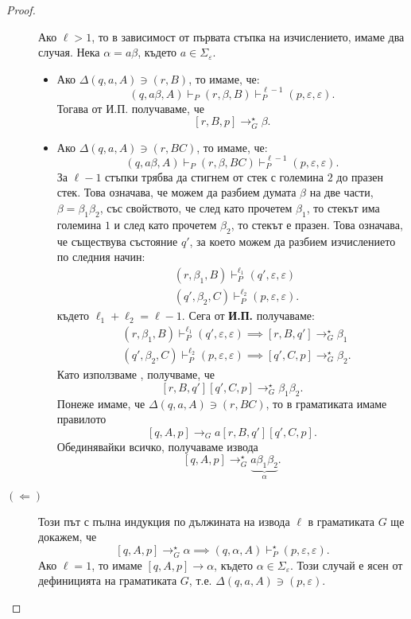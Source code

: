 \begin{proof}
\begin{description}
    Ако $\ell > 1$, то в зависимост от първата стъпка на изчислението, имаме два случая.
    Нека $\alpha = a\beta$, където $a \in \Sigma_\varepsilon$.
    \begin{itemize}
    \item 
      Ако $\Delta(q,a,A) \ni (r,B)$, то имаме, че:
      \[(q,a\beta,A) \vdash_P (r,\beta,B) \vdash^{\ell-1}_P (p, \varepsilon, \varepsilon).\]
      Тогава от И.П. получаваме, че
      \[[r,B,p] \to^\star_G \beta.\]
    \item
      Ако $\Delta(q, a, A) \ni (r, BC)$, то имаме, че:
      \[(q, a\beta, A) \vdash_P (r, \beta, BC) \vdash^{\ell-1}_P (p, \varepsilon, \varepsilon).\]      
      За $\ell-1$ стъпки трябва да стигнем от стек с големина $2$ до празен стек.
      Това означава, че можем да разбием думата $\beta$ на две части, $\beta = \beta_1\beta_2$, със свойството, че след като прочетем $\beta_1$,
      то стекът има големина $1$ и след като прочетем $\beta_2$, то стекът е празен.
      Това означава, че съществува състояние $q'$, за което можем да разбием изчислението по следния начин:
      \begin{align*}
        & (r, \beta_1, B) \vdash^{\ell_1}_P (q',\varepsilon,\varepsilon)\\
        & (q', \beta_2, C) \vdash^{\ell_2}_P (p,\varepsilon,\varepsilon).
      \end{align*}
      където $\ell_1 + \ell_2 = \ell - 1$.    
      Сега от {\bf И.П.} получаваме:
      \begin{align*}
        & (r, \beta_1, B) \vdash^{\ell_1}_P (q', \varepsilon, \varepsilon) \implies [r, B, q'] \to^\star_G \beta_1\\
        & (q', \beta_2, C) \vdash^{\ell_2}_P (p, \varepsilon, \varepsilon) \implies [q', C, p] \to^\star_G \beta_2.
      \end{align*}
      Като използваме , получваме, че
      \[[r,B,q'][q',C,p] \to^\star_G \beta_1\beta_2.\]
      Понеже имаме, че $\Delta(q,a,A) \ni (r,BC)$, то в граматиката имаме правилото
      \[[q,A,p] \rightarrow_G a[r,B,q'][q',C,p].\]
      Обединявайки всичко, получаваме извода
      \[[q,A,p] \rightarrow^\star_G \underbrace{a\beta_1\beta_2}_{\alpha}.\]
    \end{itemize}
  \item[$(\Leftarrow)$]
    Този път с пълна индукция по дължината на извода $\ell$ в граматиката $G$ ще докажем, че
    \[[q,A,p] \rightarrow^\star_G \alpha \implies (q,\alpha,A) \vdash^\star_P (p,\varepsilon,\varepsilon).\]
    Ако $\ell = 1$, то имаме $[q,A,p] \rightarrow \alpha$, където $\alpha \in \Sigma_\varepsilon$.
    Този случай е ясен от дефиницията на граматиката $G$, т.е. $\Delta(q,a,A) \ni (p,\varepsilon)$.


\end{description}
\end{proof}
